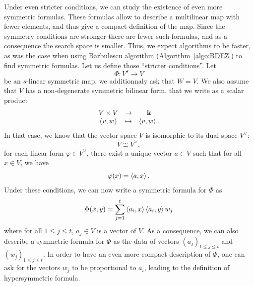 Under even stricter conditions, we can study the existence of even more
symmetric formulas. These formulas allow to describe a multilinear map with
fewer elements, and thus give a compact definition of the map. Since the
symmetry conditions are stronger there are fewer such formulas, and as a
consequence the search space is smaller. Thus, we expect algorithms to be
faster, as was the case when using Barbulescu \etal algorithm
(Algorithm~\ref{algo:BDEZ}) to find symmetric formulas. Let us define those
``stricter conditions''. Let
\[
  \Phi:V^s\to V
\]
be an $s$-linear symmetric map, \ie we additionnaly ask that $W=V$. We also
assume that $V$ has a non-degenerate symmetric bilinear form, that we write as a
scalar product
\[
 \begin{array}{ccc}
 V\times V &\to&\mathbf{k}\\
 (v,w)&\mapsto&\left\langle v,w\right\rangle.
 \end{array}
\]
In that case, we know that the vector space $V$ is isomorphic to its dual space
$V^\vee$:
\[
  V\cong V^\vee,
\]
\ie for each linear form $\varphi\in V^\vee$, there exist a unique vector $a\in
V$ such that for all $x\in V$, we have
\[
  \varphi(x) = \left\langle a,x\right\rangle.
\]
Under these conditions, we can now write a symmetric formula for $\Phi$ as
\[
  \Phi(x, y) = \sum_{j=1}^t\left\langle a_i,x\right\rangle\left\langle a_i,y\right\rangle w_j
\]
where for all $1\leq j\leq t$, $a_j\in V$ is a vector of $V$. As a consequence,
we can also describe a symmetric formula for $\Phi$ as the data of vectors
$(a_j)_{1\leq j\leq t}$ and $(w_j)_{1\leq j\leq t}$. In order to have an even
more compact description of $\Phi$, one can ask for the vectors $w_j$ to be
proportional to $a_i$, leading to the definition of hypersymmetric
formula.
%
%
%
%
%


